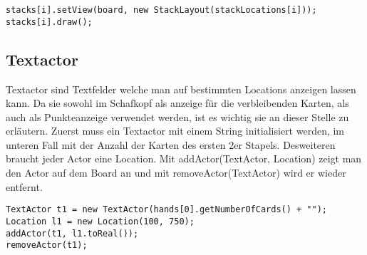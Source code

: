 \begin{lstlisting}
stacks[i].setView(board, new StackLayout(stackLocations[i]));
stacks[i].draw();
\end{lstlisting}

\subsection{Textactor}

Textactor sind Textfelder welche man auf bestimmten Locations anzeigen lassen
kann. Da sie sowohl im Schafkopf als anzeige für die verbleibenden Karten, als
auch als Punkteanzeige verwendet werden, ist es wichtig sie an dieser Stelle zu
erläutern. Zuerst muss ein Textactor mit einem String initialisiert werden, im
unteren Fall mit der Anzahl der Karten des ersten 2er Stapels. Desweiteren
braucht jeder Actor eine Location. Mit addActor(TextActor, Location) zeigt man
den Actor auf dem Board an und mit removeActor(TextActor) wird er wieder
entfernt.

\begin{lstlisting}
TextActor t1 = new TextActor(hands[0].getNumberOfCards() + "");
Location l1 = new Location(100, 750);
addActor(t1, l1.toReal());
removeActor(t1);
\end{lstlisting}
